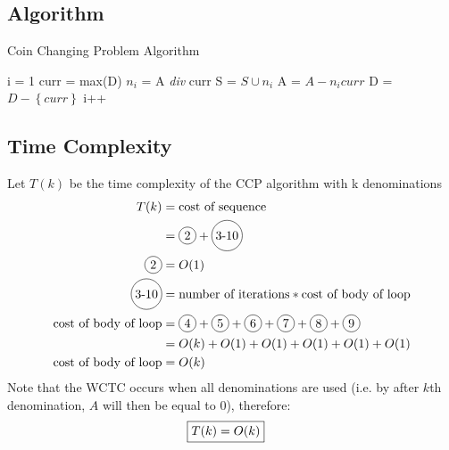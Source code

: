 \documentclass[12pt]{article}%
\newcommand*\circled[1]{\tikz[baseline=(char.base)]{
            \node[shape=circle,draw,inner sep=2pt] (char) {#1};}}
\begin{document}
  \subsection{Algorithm}
      \begin{algorithm}
			\caption{Coin Changing Problem Algorithm}\label{ccp}
			\begin{algorithmic}[1]
        \State i = 1
        \Repeat
          \State curr = max(D) 
          \State $n_i$ = A \textit{div} curr
          \State S = $S \cup n_i$
          \State A = $A - n_i curr$
          \State D = $D - \left\{curr\right\}$
          \State i++ 
			\EndFunction
			\end{algorithmic}
  \end{algorithm}
  \subsection{Time Complexity}
    Let $T(k)$ be the time complexity of the CCP algorithm with k denominations 
    \begin{align*}
      T(k) &= \text{cost of sequence} \\ 
      &= \circled{2} + \circled{3-10} \\
      \circled{2} &= O(1) \\
      \circled{3-10} &= \text{number of iterations} * \text{cost of body of loop} \\ 
      \text{cost of body of loop} &= \circled{4} + \circled{5} + \circled{6} + \circled{7} + \circled{8} + \circled{9} \\
      &= O(k) + O(1) + O(1) + O(1) + O(1) + O(1) \\
      \text{cost of body of loop} &= O(k)
    \end{align*}
    Note that the WCTC occurs when all denominations are used (i.e. by after $k$th denomination, $A$ will then be equal to $0$), therefore:
    \begin{align}
      \Aboxed{T(k) = O(k)}
    \end{align}
\end{document}
